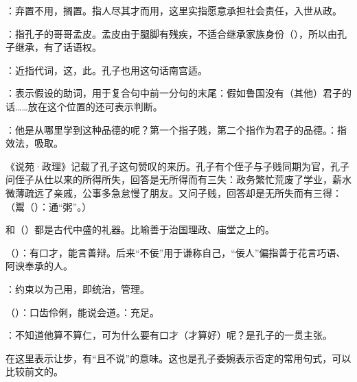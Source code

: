 {
\item {}：弃置不用，搁置。指人尽其才而用，这里实指愿意承担社会责任，入世从政。
\item {}：指孔子的哥哥孟皮。孟皮由于腿脚有残疾，不适合继承家族身份（），所以由孔子继承，有了话语权。%
}
{}  %


{
\item {}：近指代词，这，此。孔子也用这句话南宫适。

\item {}：表示假设的助词，用于复合句中前一分句的末尾：假如鲁国没有（其他）君子的话……放在这个位置的还可表示判断。
\item {}：他是从哪里学到这种品德的呢？第一个指子贱，第二个指作为君子的品德。：指效法，吸取。

《说苑·政理》记载了孔子这句赞叹的来历。孔子有个侄子与子贱同期为官，孔子问侄子从仕以来的所得所失，回答是无所得而有三失：政务繁忙荒废了学业，薪水微薄疏远了亲戚，公事多急怠慢了朋友。又问子贱，回答却是无所失而有三得：（鬻（）：通“粥”。）
}
{}


{
\item {}和（）都是古代中盛的礼器。比喻善于治国理政、庙堂之上的。
}
{}


{
\item {}（）：有口才，能言善辩。后来“不佞”用于谦称自己，“佞人”偏指善于花言巧语、阿谀奉承的人。
\item {}：约束以为己用，即统治，管理。
\item {}（）：口齿伶俐，能说会道。：充足。
\item {}：不知道他算不算仁，可为什么要有口才（才算好）呢？是孔子的一贯主张。

在这里表示让步，有“且不说”的意味。这也是孔子委婉表示否定的常用句式，可以比较前文的。
}
{}


